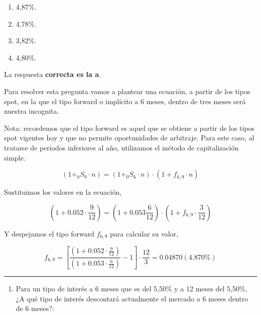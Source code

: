 \documentclass[
  letterpaper,
  DIV=11,
  numbers=noendperiod]{scrreprt}
\providecommand{\tightlist}{%
  \setlength{\itemsep}{0pt}\setlength{\parskip}{0pt}}\usepackage{longtable,booktabs,array}
\begin{document}
\begin{enumerate}
\def\labelenumi{\alph{enumi}.}
\item
  4,87\%.
\item
  4,78\%.
\item
  3,82\%.
\item
  4,80\%.
\end{enumerate}

\begin{tcolorbox}[enhanced jigsaw, left=2mm, opacityback=0, colback=white, breakable, arc=.35mm, bottomrule=.15mm, rightrule=.15mm, toprule=.15mm, leftrule=.75mm, colframe=quarto-callout-tip-color-frame]
\begin{minipage}[t]{5.5mm}
\textcolor{quarto-callout-tip-color}{\faLightbulb}
\end{minipage}%
\begin{minipage}[t]{\textwidth - 5.5mm}

La respuesta \textbf{correcta es la a}.

Para resolver esta pregunta vamos a plantear una ecuación, a partir de
los tipos spot, en la que el tipo forward o implícito a 6 meses, dentro
de tres meses será nuestra incognita.

Nota: recordemos que el tipo forward es aquel que se obtiene a partir de
los tipos spot vigentes hoy y que no permite oportunidades de arbitraje.
Para este caso, al tratarse de periodos inferiores al año, utilizamos el
método de capitalización simple.

\[(1+_{0}S_{9} \cdot {n})=(1+_{0}S_{6} \cdot n)\cdot(1+f_{6,9}\cdot {n})\]

Sustituimos los valores en la ecuación,

\[(1+0.052\cdot \frac{9}{12})=(1+0.053\frac{6}{12})\cdot(1+f_{6,9}\cdot \frac{3}{12})\]

Y despejamos el tipo forward \(f_{6,9}\) para calcular su valor,

\[f_{6,9}=\left[\frac{(1+0.052\cdot \frac{9}{12})}{(1+0.053\cdot \frac{6}{12})}-1\right]\cdot\frac{ 12}{3}=0.04870(4.870\%)\]

\end{minipage}%
\end{tcolorbox}

\begin{center}\rule{0.5\linewidth}{0.5pt}\end{center}

\begin{enumerate}
\def\labelenumi{\arabic{enumi}.}
\setcounter{enumi}{37}
\tightlist
\item
  Para un tipo de interés a 6 meses que es del 5,50\% y a 12 meses del
  5,50\%, ¿A qué tipo de interés descontará actualmente el mercado a 6
  meses dentro de 6 meses?:
\end{enumerate}
\end{document}
